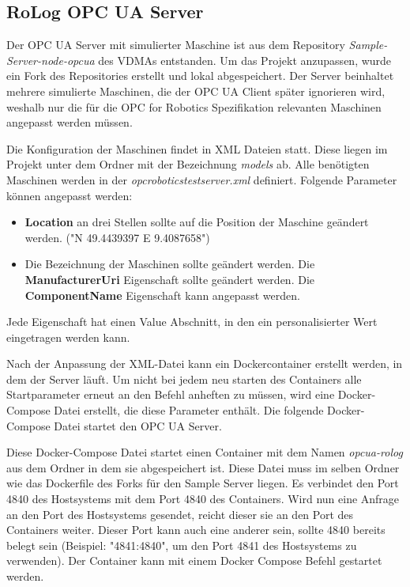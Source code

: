 \documentclass[a4paper, 12pt, oneside, toc=listofnumbered, bibliography=totoc]{scrbook}
\begin{document}
		\subsection{RoLog OPC UA Server}\label{ch:RoLogOPCUA}
		
		Der OPC UA Server mit simulierter Maschine ist aus dem Repository \textit{Sample-Server-node-opcua} des VDMAs entstanden. Um das Projekt anzupassen, wurde ein Fork des Repositories erstellt und lokal abgespeichert. Der Server beinhaltet mehrere simulierte Maschinen, die der OPC UA Client später ignorieren wird, weshalb nur die für die OPC for Robotics Spezifikation relevanten Maschinen angepasst werden müssen. 
		
		Die Konfiguration der Maschinen findet in XML Dateien statt. Diese liegen im Projekt unter dem Ordner mit der Bezeichnung \textit{models} ab. Alle benötigten Maschinen werden in der \textit{opcroboticstestserver.xml} definiert. Folgende Parameter können angepasst werden:
		
		\begin{itemize}
			\item \textbf{Location} an drei Stellen sollte auf die Position der Maschine geändert werden. ("N 49.4439397 E 9.4087658")
			\item Die Bezeichnung der Maschinen sollte geändert werden.
			\subitem Die \textbf{ManufacturerUri} Eigenschaft sollte geändert werden.
			\subitem Die \textbf{ComponentName} Eigenschaft kann angepasst werden. 
		\end{itemize}
		Jede Eigenschaft hat einen Value Abschnitt, in den ein personalisierter Wert eingetragen werden kann.
		
		Nach der Anpassung der XML-Datei kann ein Dockercontainer erstellt werden, in dem der Server läuft. Um nicht bei jedem neu starten des Containers alle Startparameter erneut an den Befehl anheften zu müssen, wird eine Docker-Compose Datei erstellt, die diese Parameter enthält. Die folgende Docker-Compose Datei startet den OPC UA Server.
		
		
		
		Diese Docker-Compose Datei startet einen Container mit dem Namen \textit{opcua-rolog} aus dem Ordner in dem sie abgespeichert ist. Diese Datei muss im selben Ordner wie das Dockerfile des Forks für den Sample Server liegen. Es verbindet den Port 4840 des Hostsystems mit dem Port 4840 des Containers. Wird nun eine Anfrage an den Port des Hostsystems gesendet, reicht dieser sie an den Port des Containers weiter. Dieser Port kann auch eine anderer sein, sollte 4840 bereits belegt sein (Beispiel: "4841:4840", um den Port 4841 des Hostsystems zu verwenden). Der Container kann mit einem Docker Compose Befehl gestartet werden. 
	
\end{document}
